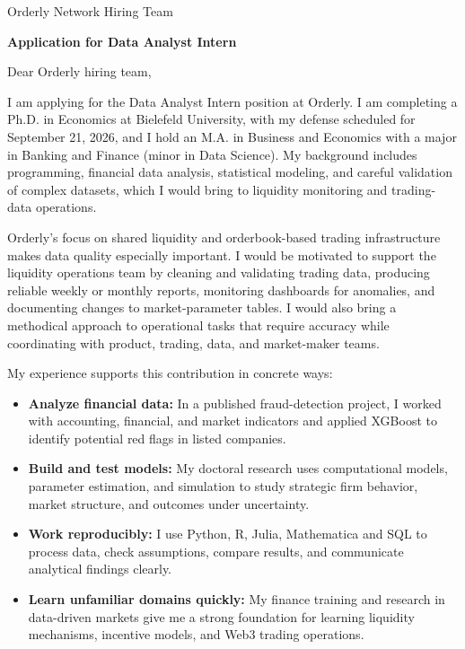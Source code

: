 \documentclass[11pt]{article}
\begin{document}
\noindent
Orderly Network Hiring Team

\vspace{0.15cm}

\noindent
\textbf{Application for Data Analyst Intern}

\vspace{0.15cm}

\noindent Dear Orderly hiring team,

I am applying for the Data Analyst Intern position at Orderly. 
I am completing a Ph.D. in Economics at Bielefeld University, with my defense scheduled for September 21, 2026, 
and I hold an M.A. in Business and Economics with a major in Banking and Finance (minor in Data Science). 
My background includes programming, financial data analysis, statistical modeling, and careful validation of complex datasets, 
which I would bring to liquidity monitoring and trading-data operations.

Orderly's focus on shared liquidity and orderbook-based trading infrastructure makes data quality especially important. 
I would be motivated to support the liquidity operations team by cleaning and validating trading data, producing reliable weekly or monthly reports, 
monitoring dashboards for anomalies, and documenting changes to market-parameter tables. 
I would also bring a methodical approach to operational tasks that require accuracy while coordinating with product, trading, data, and market-maker teams.

My experience supports this contribution in concrete ways:

\begin{itemize}
    \item \textbf{Analyze financial data:} In a published fraud-detection project, I worked with accounting, financial, and market indicators and applied XGBoost to identify potential red flags in listed companies.
    \item \textbf{Build and test models:} My doctoral research uses computational models, parameter estimation, and simulation to study strategic firm behavior, market structure, and outcomes under uncertainty.
    \item \textbf{Work reproducibly:} I use Python, R, Julia, Mathematica and SQL to process data, check assumptions, compare results, and communicate analytical findings clearly.
    \item \textbf{Learn unfamiliar domains quickly:} My finance training and research in data-driven markets give me a strong foundation for learning liquidity mechanisms, incentive models, and Web3 trading operations.
\end{itemize}
\end{document}
